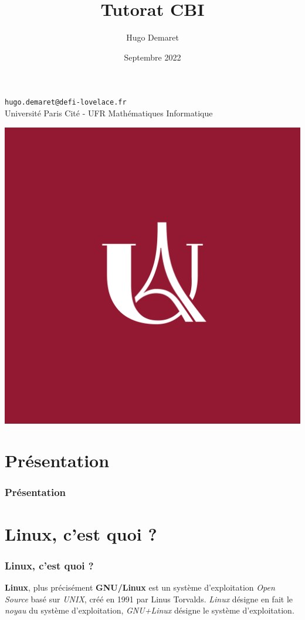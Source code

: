 \documentclass{beamer}
\title{Tutorat CBI}
\author{Hugo Demaret}
\date{Septembre 2022}
\begin{document}
    \begin{titlepage}
        \begin{center}
            \texttt{hugo.demaret@defi-lovelace.fr}\\
            Université Paris Cité - UFR Mathématiques Informatique
            
            \vspace*{0.5cm}
            
            \includegraphics[scale=0.02]{./src/cover_image.png}
        \end{center}
    \end{titlepage}
    \begin{frame}
        \tableofcontents
    \end{frame}
    \section{Présentation}
        \begin{frame}
            \frametitle{Présentation}
        \end{frame}
    \section{Linux, c'est quoi ?}
        \begin{frame}
            \frametitle{Linux, c'est quoi ?}
                \textbf{Linux}, plus précisément \textbf{GNU/Linux} est un système d'exploitation
                \emph{Open Source} basé sur \emph{UNIX}, créé en 1991 par Linus Torvalds.
                \emph{Linux} désigne en fait le \emph{noyau} du système d'exploitation, \emph{GNU+Linux} désigne le système d'exploitation.
        \end{frame}
\end{document}

